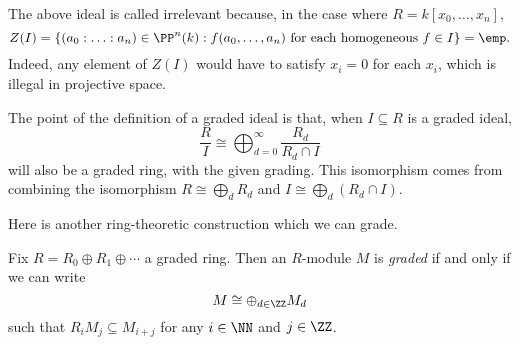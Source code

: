 \begin{remark}
	The above ideal is called irrelevant because, in the case where $R=k[x_0,\ldots,x_n]$,
	\[Z(I)=\left\{(a_0:\ldots:a_n)\in\PP^n(k):f(a_0,\ldots,a_n)\text{ for each homogeneous }f\in I\right\}=\emp.\]
	Indeed, any element of $Z(I)$ would have to satisfy $x_i=0$ for each $x_i$, which is illegal in projective space.
\end{remark}
The point of the definition of a graded ideal is that, when $I\subseteq R$ is a graded ideal,
\[\frac RI\cong\bigoplus_{d=0}^\infty\frac{R_d}{R_d\cap I}\]
will also be a graded ring, with the given grading. This isomorphism comes from combining the isomorphism $R\cong\bigoplus_dR_d$ and $I\cong\bigoplus_d(R_d\cap I)$.

Here is another ring-theoretic construction which we can grade.
\begin{definition}
	Fix $R=R_0\oplus R_1\oplus\cdots$ a graded ring. Then an $R$-module $M$ is \textit{graded} if and only if we can write
	\[M\cong\oplus_{d\in\ZZ}M_d\]
	such that $R_iM_j\subseteq M_{i+j}$ for any $i\in\NN$ and $j\in\ZZ$.
\end{definition}

